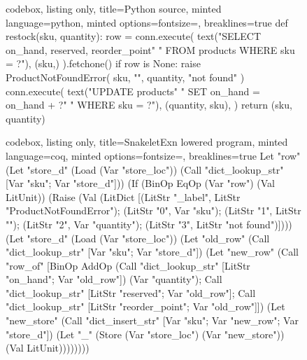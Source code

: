 \documentclass[11pt,a4paper]{article}
\begin{document}
\begin{figure}[t]
\centering
\begin{tcbraster}[raster columns=2, raster equal height,
  raster column skip=3mm, raster force size=false]
\begin{tcblisting}{codebox, listing only, title={\footnotesize Python source},
  minted language=python,
  minted options={fontsize=\fontsize{7}{8}\selectfont, breaklines=true}}
def restock(sku, quantity):
    row = conn.execute(
        text("SELECT on_hand, reserved, reorder_point"
             " FROM products WHERE sku = ?"),
        (sku,)
    ).fetchone()
    if row is None:
        raise ProductNotFoundError(
            sku, "", quantity, "not found"
        )
    conn.execute(
        text("UPDATE products"
             " SET on_hand = on_hand + ?"
             " WHERE sku = ?"),
        (quantity, sku),
    )
    return (sku, quantity)
\end{tcblisting}
\begin{tcblisting}{codebox, listing only,
  title={\footnotesize SnakeletExn lowered program},
  minted language=coq,
  minted options={fontsize=\fontsize{7}{8}\selectfont, breaklines=true}}
Let "row"
  (Let "store_d"
     (Load (Var "store_loc"))
     (Call "dict_lookup_str"
        [Var "sku"; Var "store_d"]))
  (If (BinOp EqOp (Var "row")
                  (Val LitUnit))
     (Raise (Val (LitDict
        [(LitStr "_label",
          LitStr "ProductNotFoundError");
         (LitStr "0", Var "sku");
         (LitStr "1", LitStr "");
         (LitStr "2", Var "quantity");
         (LitStr "3",
          LitStr "not found")])))
     (Let "store_d"
        (Load (Var "store_loc"))
        (Let "old_row"
           (Call "dict_lookup_str"
              [Var "sku"; Var "store_d"])
           (Let "new_row"
              (Call "row_of"
                 [BinOp AddOp
                    (Call "dict_lookup_str"
                       [LitStr "on_hand";
                        Var "old_row"])
                    (Var "quantity");
                  Call "dict_lookup_str"
                    [LitStr "reserved";
                     Var "old_row"];
                  Call "dict_lookup_str"
                    [LitStr "reorder_point";
                     Var "old_row"]])
              (Let "new_store"
                 (Call "dict_insert_str"
                    [Var "sku";
                     Var "new_row";
                     Var "store_d"])
                 (Let "_"
                    (Store (Var "store_loc")
                     (Var "new_store"))
                    (Val LitUnit))))))))

\end{tcblisting}
\end{tcbraster}
\end{figure}
\end{document}
